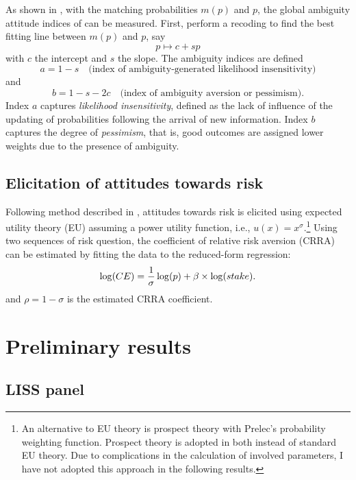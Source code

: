 \documentclass[]{article}
\begin{document}
As shown in \citet{dimmock2016ambiguity}, with the matching probabilities $m(p)$ and $p$, the global ambiguity attitude indices of \citet{abdellaoui2011} can be measured. First, perform a recoding to find the best fitting line between $m(p)$ and $p$, say
\[p\mapsto c+sp \]
with $c$ the intercept and $s$ the slope. The ambiguity indices are defined
\begin{equation}
	a= 1-s\quad\text{(index of ambiguity-generated likelihood insensitivity)}
\end{equation}
and
\begin{equation}
	b = 1-s-2c\quad\text{(index of ambiguity aversion or pessimism).}
\end{equation}
Index $a$ captures \textit{likelihood insensitivity}, defined as the lack of influence of the updating of probabilities following the arrival of new information. Index $b$ captures the degree of \textit{pessimism}, that is, good outcomes are assigned lower weights due to the presence of ambiguity.

\subsection{Elicitation of attitudes towards risk}
Following method described in \citet{tanaka2010, abdellaoui2011}, attitudes towards risk is elicited using expected utility theory (EU) assuming a power utility function, i.e., $u(x)=x^\sigma$.\footnote{An alternative to EU theory is prospect theory \citep{tversky1992advances} with Prelec's \citeyearpar{prelec1998probability} probability weighting function. Prospect theory is adopted in both \citet{tanaka2010, abdellaoui2011} instead of standard EU theory. Due to complications in the calculation of involved parameters, I have not adopted this approach in the following results.} Using two sequences of risk question, the coefficient of relative risk aversion (CRRA) can be estimated by fitting the data to the reduced-form regression:
\begin{equation}
	\log(CE)={1\over \sigma}\log(p) + \beta\times \log(stake).
\end{equation}
and $\rho=1-\sigma$ is the estimated CRRA coefficient.


\section{Preliminary results}
\subsection{LISS panel}




\pagebreak



\end{document}
